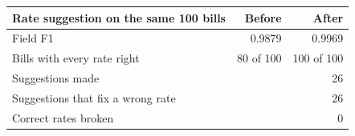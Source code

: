 \begin{tabular}{@{}lrr@{}}
\toprule
Rate suggestion on the same 100 bills & Before & After \\
\midrule
Field F1 & 0.9879 & 0.9969 \\
Bills with every rate right & 80 of 100 & 100 of 100 \\
Suggestions made & \multicolumn{2}{r}{26} \\
Suggestions that fix a wrong rate & \multicolumn{2}{r}{26} \\
Correct rates broken & \multicolumn{2}{r}{0} \\
\bottomrule
\end{tabular}

